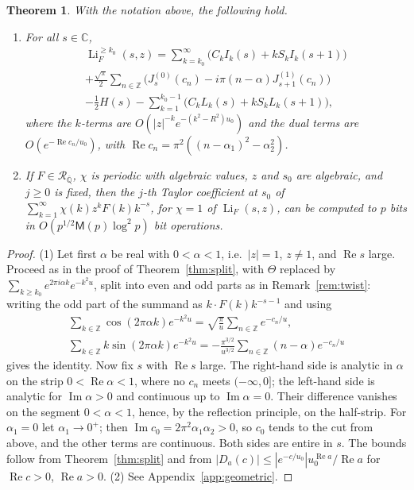 \documentclass[11pt,reqno]{amsart}
\newtheorem{theorem}{Theorem}[section]
\theoremstyle{definition}
\theoremstyle{remark}
\newcommand{\Li}{\operatorname{Li}}
\newcommand{\Qbar}{\overline{\mathbb{Q}}}
\newcommand{\RegQ}{\mathcal{R}_{\Qbar}}
\newcommand{\ZZ}{\mathbb{Z}}
\newcommand{\CC}{\mathbb{C}}
\newcommand{\Mul}{\mathsf{M}}
\begin{document}
\begin{theorem}\label{thm:geometric}
With the notation above, the following hold.
\begin{enumerate}
\item For all $s \in \CC$,
\begin{multline*}
  \Li_F^{\ge k_0}(s,z) = \sum_{k=k_0}^{\infty}\bigl(C_kI_k(s) + kS_kI_k(s+1)\bigr) \\
  + \frac{\sqrt\pi}2\sum_{n\in\ZZ}\bigl(J^{(0)}_s(c_n) - i\pi(n-\alpha)J^{(1)}_{s+1}(c_n)\bigr) \\
  - \frac12H(s) - \sum_{k=1}^{k_0-1}\bigl(C_kL_k(s) + kS_kL_k(s+1)\bigr),
\end{multline*}
where the $k$-terms are $O(|z|^{-k}e^{-(k^2-R^2)u_0})$ and the dual terms are $O(e^{-\operatorname{Re}c_n/u_0})$,
with $\operatorname{Re}c_n = \pi^2((n-\alpha_1)^2 - \alpha_2^2)$.
\item If $F \in \RegQ$, $\chi$ is periodic with
algebraic values, $z$ and $s_0$ are algebraic, and $j \ge 0$ is fixed, then the $j$-th Taylor coefficient at
$s_0$ of $\sum_{k=1}^{\infty}\chi(k)z^kF(k)k^{-s}$, for $\chi = 1$ of $\Li_F(s,z)$, can be computed to $p$ bits in
$O(p^{1/2}\Mul(p)\log^2p)$ bit operations.
\end{enumerate}
\end{theorem}

\begin{proof}
(1) Let first $\alpha$ be real with $0 < \alpha < 1$, i.e.\ $|z| = 1$, $z \ne 1$, and $\operatorname{Re}s$ large. Proceed
as in the proof of Theorem~\ref{thm:split}, with $\Theta$ replaced by $\sum_{k\ge k_0}e^{2\pi i\alpha k}e^{-k^2u}$,
split into even and odd parts as in Remark~\ref{rem:twist}: writing the odd part of the summand as $k\cdot F(k)k^{-s-1}$
and using
\begin{gather*}
  \sum_{k\in\ZZ}\cos(2\pi\alpha k)e^{-k^2u} = \sqrt{\frac\pi u}\sum_{n\in\ZZ}e^{-c_n/u}, \\
  \sum_{k\in\ZZ}k\sin(2\pi\alpha k)e^{-k^2u} = -\frac{\pi^{3/2}}{u^{3/2}}\sum_{n\in\ZZ}(n-\alpha)e^{-c_n/u}
\end{gather*}
gives the identity. Now fix $s$ with $\operatorname{Re}s$ large. The right-hand side is analytic in $\alpha$ on the
strip $0 < \operatorname{Re}\alpha < 1$, where no $c_n$ meets $(-\infty,0]$; the left-hand side is analytic for
$\operatorname{Im}\alpha > 0$ and continuous up to $\operatorname{Im}\alpha = 0$. Their difference vanishes on the
segment $0 < \alpha < 1$, hence, by the reflection principle, on the half-strip. For $\alpha_1 = 0$ let
$\alpha_1 \to 0^+$; then $\operatorname{Im}c_0 = 2\pi^2\alpha_1\alpha_2 > 0$, so $c_0$ tends to the cut from above, and the
other terms are continuous. Both sides are entire in $s$. The bounds follow from Theorem~\ref{thm:split} and from
$|D_a(c)| \le |e^{-c/u_0}|u_0^{\operatorname{Re}a}/\operatorname{Re}a$ for $\operatorname{Re}c > 0$,
$\operatorname{Re}a > 0$.
(2) See Appendix~\ref{app:geometric}.
\end{proof}
\end{document}
